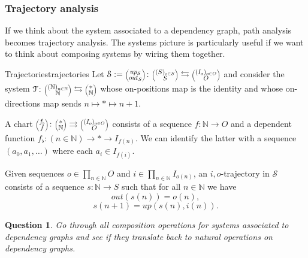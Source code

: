 \documentclass[12pt, a4paper]{article}
\theoremstyle{definition}
\theoremstyle{plain}
\theoremstyle{plain}
\theoremstyle{plain}
\theoremstyle{plain}
\newtheorem{question}[counter]{Question}
\theoremstyle{plain}
\theoremstyle{remark}
\theoremstyle{remark}
\newcommand{\mc}[1]{\mathcal{#1}}
\newcommand{\lens}[2]{\scaleobj{0.6}{\begin{pmatrix} \scaleobj{1.3}{{#1}} \\ \scaleobj{1.3}{{#2}} \end{pmatrix}}}
\begin{document}
\subsubsection{Trajectory analysis}
If we think about the system associated to a dependency graph, path analysis becomes trajectory analysis. The systems picture is particularly useful if we want to think about composing systems by wiring them together.

\begin{tcdefinition}{Trajectories}{trajectories}
	Let $\mc{S} := \lens{up_S}{out_S} \colon \lens{(S)_{s \in S}}{S} \leftrightarrows \lens{(I_o)_{o \in O}}{O}$ and consider the system $\mc{T} \colon \lens{(\mathbb{N})_{n \in \mathbb{N}}}{\mathbb{N}} \leftrightarrows \lens{*}{\mathbb{N}}$ whose on-positions map is the identity and whose on-directions map sends $n \mapsto * \mapsto n+1$.

	A chart $\lens{f_\flat}{f} \colon \lens{*}{\mathbb{N}} \rightrightarrows \lens{(I_o)_{o \in O}}{O}$ consists of a sequence $f \colon \mathbb{N} \rightarrow O$ and a dependent function $f_\flat \colon (n \in \mathbb{N}) \rightarrow * \rightarrow I_{f(n)}$. We can identify the latter with a sequence $(a_0, a_1, \ldots)$ where each $a_i \in I_{f(i)}$.

	Given sequences $o \in \prod_{n \in \mathbb{N}} O$ and $i \in \prod_{n \in \mathbb{N}} I_{o(n)}$, an $i,o$-trajectory in $\mc{S}$ consists of a sequence $s \colon \mathbb{N} \rightarrow S$ such that for all $n \in \mathbb{N}$ we have
	$$out(s(n)) = o(n), $$
	$$s(n+1) = up(s(n), i(n)).$$
\end{tcdefinition}

\begin{question}
	Go through all composition operations for systems associated to dependency graphs and see if they translate back to natural operations on dependency graphs.
\end{question}
\end{document}
